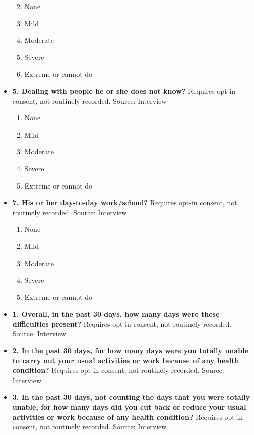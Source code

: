 \documentclass[
]{scrartcl}
\providecommand{\tightlist}{%
  \setlength{\itemsep}{0pt}\setlength{\parskip}{0pt}}\usepackage{longtable,booktabs,array}
\begin{document}
\begin{itemize}
  \begin{enumerate}
  \def\labelenumi{\arabic{enumi}.}
  \tightlist
  \item
    None
  \item
    Mild
  \item
    Moderate
  \item
    Severe
  \item
    Extreme or cannot do
  \end{enumerate}
\item
  \textbf{5. Dealing with people he or she does not know?} Requires
  opt-in consent, not routinely recorded. Source: Interview

  \begin{enumerate}
  \def\labelenumi{\arabic{enumi}.}
  \tightlist
  \item
    None
  \item
    Mild
  \item
    Moderate
  \item
    Severe
  \item
    Extreme or cannot do
  \end{enumerate}
\item
  \textbf{7. His or her day-to-day work/school?} Requires opt-in
  consent, not routinely recorded. Source: Interview

  \begin{enumerate}
  \def\labelenumi{\arabic{enumi}.}
  \tightlist
  \item
    None
  \item
    Mild
  \item
    Moderate
  \item
    Severe
  \item
    Extreme or cannot do
  \end{enumerate}
\item
  \textbf{1. Overall, in the past 30 days, how many days were these
  difficulties present?} Requires opt-in consent, not routinely
  recorded. Source: Interview
\item
  \textbf{2. In the past 30 days, for how many days were you totally
  unable to carry out your usual activities or work because of any
  health condition?} Requires opt-in consent, not routinely recorded.
  Source: Interview
\item
  \textbf{3. In the past 30 days, not counting the days that you were
  totally unable, for how many days did you cut back or reduce your
  usual activities or work because of any health condition?} Requires
  opt-in consent, not routinely recorded. Source: Interview
\end{itemize}
\end{document}
